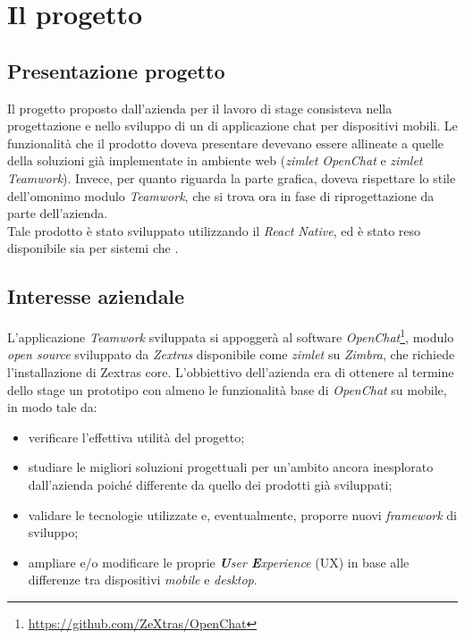 
\chapter{Il progetto}\label{chap:project}
\section{Presentazione progetto}
Il progetto proposto dall'azienda per il lavoro di stage consisteva nella progettazione e nello sviluppo di un  di applicazione chat per dispositivi mobili. Le funzionalità che il prodotto doveva presentare devevano essere allineate a quelle della soluzioni già implementate in ambiente web (\emph{zimlet OpenChat} e \emph{zimlet Teamwork}). Invece, per quanto riguarda la parte grafica, doveva rispettare lo stile dell'omonimo modulo \emph{Teamwork}, che si trova ora in fase di riprogettazione da parte dell'azienda. \\
Tale prodotto è stato sviluppato utilizzando il  \emph{React Native}, ed è stato reso disponibile sia per sistemi  che .

\section{Interesse aziendale} \label{sec:intaz}
L'applicazione \emph{Teamwork} sviluppata si appoggerà al software \emph{OpenChat}\footnote{\url{https://github.com/ZeXtras/OpenChat}}, modulo \emph{open source} sviluppato da \emph{Zextras} disponibile come \emph{zimlet} su \emph{Zimbra}, che richiede l'installazione di Zextras core.
L'obbiettivo dell'azienda era di ottenere al termine dello stage un prototipo con almeno le funzionalità base di \emph{OpenChat} su mobile, in modo tale da:
\begin{itemize}
	\item verificare l'effettiva utilità del progetto;
	\item studiare le migliori soluzioni progettuali per un'ambito ancora inesplorato dall'azienda poiché differente da quello dei prodotti già sviluppati;
	\item validare le tecnologie utilizzate e, eventualmente, proporre nuovi \emph{framework} di sviluppo;
	\item ampliare e/o modificare le proprie \emph{\textbf{U}ser \textbf{E}xperience} (\acrshort{UX})  in base alle differenze tra dispositivi \emph{mobile} e \emph{desktop}.
\end{itemize}


